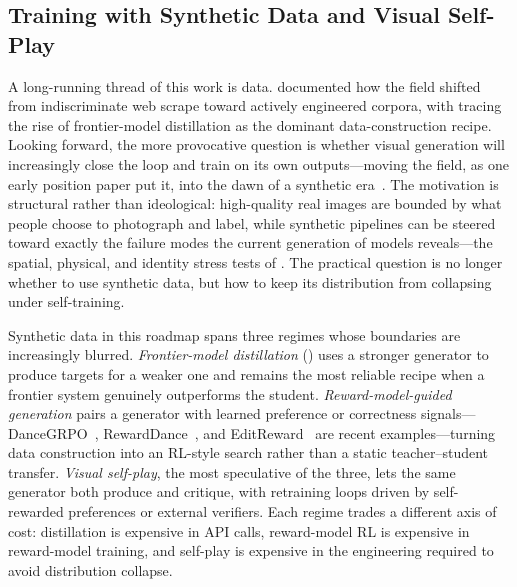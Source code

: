 \documentclass{llmxive}
\begin{document}
\subsection{Training with Synthetic Data and Visual Self-Play}
\label{subsec:synthetic_self_play}

A long-running thread of this work is data.  documented how the field shifted from indiscriminate web scrape toward actively engineered corpora, with  tracing the rise of frontier-model distillation as the dominant data-construction recipe. Looking forward, the more provocative question is whether visual generation will increasingly close the loop and train on its own outputs---moving the field, as one early position paper put it, into the dawn of a synthetic era~\citep{yang2023aigs}. The motivation is structural rather than ideological: high-quality real images are bounded by what people choose to photograph and label, while synthetic pipelines can be steered toward exactly the failure modes the current generation of models reveals---the spatial, physical, and identity stress tests of . The practical question is no longer whether to use synthetic data, but how to keep its distribution from collapsing under self-training.

Synthetic data in this roadmap spans three regimes whose boundaries are increasingly blurred. \emph{Frontier-model distillation} () uses a stronger generator to produce targets for a weaker one and remains the most reliable recipe when a frontier system genuinely outperforms the student. \emph{Reward-model-guided generation} pairs a generator with learned preference or correctness signals---DanceGRPO~\citep{xue2025dancegrpo}, RewardDance~\citep{wu2025rewarddance}, and EditReward~\citep{wu2025editreward} are recent examples---turning data construction into an RL-style search rather than a static teacher--student transfer. \emph{Visual self-play}, the most speculative of the three, lets the same generator both produce and critique, with retraining loops driven by self-rewarded preferences or external verifiers. Each regime trades a different axis of cost: distillation is expensive in API calls, reward-model RL is expensive in reward-model training, and self-play is expensive in the engineering required to avoid distribution collapse.
\end{document}
